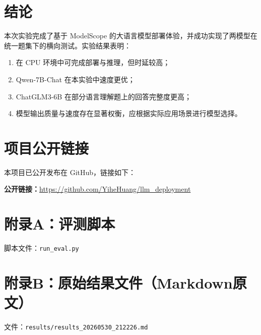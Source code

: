\documentclass[12pt,a4paper]{ctexart}
\begin{document}
\section{结论}
本次实验完成了基于 ModelScope 的大语言模型部署体验，并成功实现了两模型在统一题集下的横向测试。实验结果表明：
\begin{enumerate}
  \item 在 CPU 环境中可完成部署与推理，但时延较高；
  \item Qwen-7B-Chat 在本实验中速度更优；
  \item ChatGLM3-6B 在部分语言理解题上的回答完整度更高；
  \item 模型输出质量与速度存在显著权衡，应根据实际应用场景进行模型选择。
\end{enumerate}

\section{项目公开链接}
本项目已公开发布在 GitHub，链接如下：

\vspace{0.3cm}
\noindent\textbf{公开链接：}\url{https://github.com/YiheHuang/llm_deployment}

\appendix
\section{附录A：评测脚本}
脚本文件：\texttt{run\_eval.py}



\section{附录B：原始结果文件（Markdown原文）}
文件：\texttt{results/results\_20260530\_212226.md}


\end{document}
